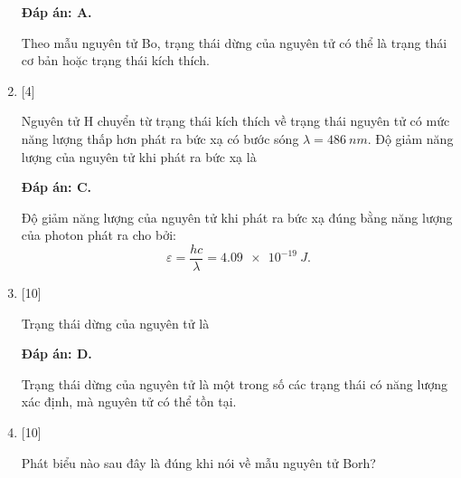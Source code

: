 \begin{enumerate}[label=\bfseries Câu \arabic*:]
	\loigiai
	{		\textbf{Đáp án: A.}
		
		Theo mẫu nguyên tử Bo, trạng thái dừng của nguyên tử có thể là trạng thái cơ bản hoặc trạng thái kích thích. 
	}
	
	\item {} [4]
		\cauhoi
	{Nguyên tử H chuyển từ trạng thái kích thích về trạng thái nguyên tử có mức năng lượng thấp hơn phát ra bức xạ có bước sóng $ \lambda = \SI{486}{nm} $. Độ giảm năng lượng của nguyên tử khi phát ra bức xạ là
	}
	
	\loigiai
	{		\textbf{Đáp án: C.}
		
		Độ giảm năng lượng của nguyên tử khi phát ra bức xạ đúng bằng năng lượng của photon phát ra cho bởi:
		$$
		\varepsilon = \dfrac{hc}{\lambda} = \SI{4,09e-19}{J}.
		$$
	}
	
	\item {} [10]
	\cauhoi
	{Trạng thái dừng của nguyên tử là
	}
	
	\loigiai
	{		\textbf{Đáp án: D.}
		
		Trạng thái dừng của nguyên tử là một trong số các trạng thái có năng lượng xác định, mà nguyên tử có thể tồn tại.		
	}
	
	\item {} [10]
		\cauhoi
	{Phát biểu nào sau đây là đúng khi nói về mẫu nguyên tử Borh?
	}
	

\end{enumerate}
